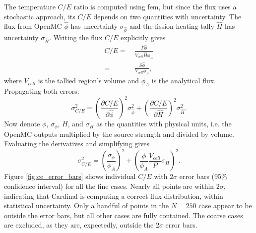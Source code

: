 \documentclass[letterpaper]{mc2023}
\begin{document}
The temperature $C/E$ ratio is computed using \gls{fem}, but since the flux uses a stochastic approach, its $C/E$ depends on two quantities with
uncertainty. The flux from OpenMC $\hat{\phi}$ has uncertainty $\sigma_{\hat{\phi}}$ and the fission heating tally $\hat{H}$ has uncertainty
$\sigma_{\hat{H}}$. Writing the flux $C/E$ explicitly gives
\begin{equation}\begin{aligned}\label{eq:CE_formula}
    C/E =&\ 
    \frac{P\hat{\phi}}{V_{cell}\hat{H}\phi_{A}}\\ =&\  \frac{S\hat{\phi}}{V_{cell}\phi_{A}},
\end{aligned}\end{equation}
where $V_{cell}$ is the tallied region's volume and $\phi_{A}$ is the analytical flux. Propagating both errors:
\begin{equation}\label{eq:sigma_ce_def}
    \sigma_{C/E}^2 =
    \left( \frac{\partial C/E}{\partial\hat{\phi}} \right)^2 \sigma_{\hat{\phi}}^2  +
     \left( \frac{\partial C/E}{\partial \hat{H}} \right)^2 \sigma_{\hat{H}}^2 .
\end{equation}
Now denote $\phi$, $\sigma_{\phi}$, $H$, and $\sigma_{H}$ as the quantities with physical units, i.e. the OpenMC outputs multiplied by the source
strength and divided by volume. Evaluating the derivatives and simplifying gives
\begin{equation}\label{eq:sigma_CE_physical_units}
    \sigma_{C/E}^2 =
    \left(\frac{\sigma_{\phi} }{\phi_{A}} \right)^2 +
     \left( \frac{\phi}{\phi_{A}}\frac{V_{cell}}{P}\sigma_{H} \right)^2.
\end{equation}
Figure \ref{fig:ce_error_bars} shows individual $C/E$ with $2\sigma$ error bars (95\% confidence interval) for all the fine cases. Nearly all points
are within $2\sigma$, indicating that Cardinal is computing a correct flux distribution, within statistical uncertainty. Only a handful of points in
the $N=250$ case appear to be outside the error bars, but all other cases are fully contained. The coarse cases are excluded, as they are, expectedly,
outside the $2\sigma$ error bars.
\end{document}
